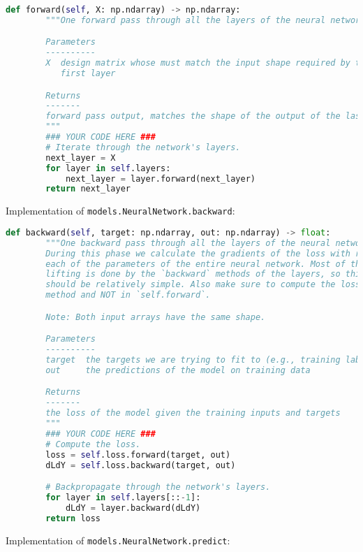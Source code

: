 \begin{lstlisting}[language=Python]
    def forward(self, X: np.ndarray) -> np.ndarray:
        """One forward pass through all the layers of the neural network.

        Parameters
        ----------
        X  design matrix whose must match the input shape required by the
           first layer

        Returns
        -------
        forward pass output, matches the shape of the output of the last layer
        """
        ### YOUR CODE HERE ###
        # Iterate through the network's layers.
        next_layer = X
        for layer in self.layers:
            next_layer = layer.forward(next_layer)
        return next_layer

\end{lstlisting}

Implementation of \texttt{models.NeuralNetwork.backward}:

\begin{lstlisting}[language=Python]
    def backward(self, target: np.ndarray, out: np.ndarray) -> float:
        """One backward pass through all the layers of the neural network.
        During this phase we calculate the gradients of the loss with respect to
        each of the parameters of the entire neural network. Most of the heavy
        lifting is done by the `backward` methods of the layers, so this method
        should be relatively simple. Also make sure to compute the loss in this
        method and NOT in `self.forward`.

        Note: Both input arrays have the same shape.

        Parameters
        ----------
        target  the targets we are trying to fit to (e.g., training labels)
        out     the predictions of the model on training data

        Returns
        -------
        the loss of the model given the training inputs and targets
        """
        ### YOUR CODE HERE ###
        # Compute the loss.
        loss = self.loss.forward(target, out)
        dLdY = self.loss.backward(target, out)

        # Backpropagate through the network's layers.
        for layer in self.layers[::-1]:
            dLdY = layer.backward(dLdY)
        return loss

\end{lstlisting}

Implementation of \texttt{models.NeuralNetwork.predict}:

